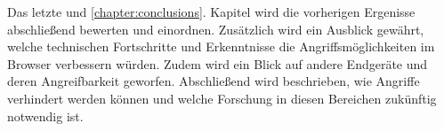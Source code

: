 \par \medskip  

Das letzte und \ref{chapter:conclusions}. Kapitel wird die vorherigen Ergenisse abschließend bewerten und einordnen.
Zusätzlich wird ein Ausblick gewährt, welche technischen Fortschritte und Erkenntnisse die Angriffsmöglichkeiten im Browser verbessern würden.
Zudem wird ein Blick auf andere Endgeräte und deren Angreifbarkeit geworfen.
Abschließend wird beschrieben, wie Angriffe verhindert werden können und welche Forschung in diesen Bereichen zukünftig notwendig ist.





